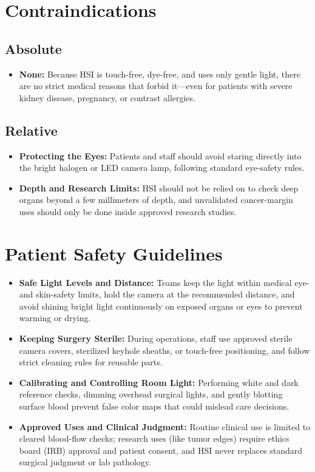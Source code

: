 \section{Contraindications}

\subsection{Absolute}
\begin{itemize}
    \item \textbf{None:} Because HSI is touch-free, dye-free, and uses only gentle light, there are no strict medical reasons that forbid it---even for patients with severe kidney disease, pregnancy, or contrast allergies.
\end{itemize}

\subsection{Relative}
\begin{itemize}
    \item \textbf{Protecting the Eyes:} Patients and staff should avoid staring directly into the bright halogen or LED camera lamp, following standard eye-safety rules.
    \item \textbf{Depth and Research Limits:} HSI should not be relied on to check deep organs beyond a few millimeters of depth, and unvalidated cancer-margin uses should only be done inside approved research studies.
\end{itemize}

\section{Patient Safety Guidelines}
\begin{itemize}
    \item \textbf{Safe Light Levels and Distance:} Teams keep the light within medical eye- and skin-safety limits, hold the camera at the recommended distance, and avoid shining bright light continuously on exposed organs or eyes to prevent warming or drying.
    \item \textbf{Keeping Surgery Sterile:} During operations, staff use approved sterile camera covers, sterilized keyhole sheaths, or touch-free positioning, and follow strict cleaning rules for reusable parts.
    \item \textbf{Calibrating and Controlling Room Light:} Performing white and dark reference checks, dimming overhead surgical lights, and gently blotting surface blood prevent false color maps that could mislead care decisions.
    \item \textbf{Approved Uses and Clinical Judgment:} Routine clinical use is limited to cleared blood-flow checks; research uses (like tumor edges) require ethics board (IRB) approval and patient consent, and HSI never replaces standard surgical judgment or lab pathology.
\end{itemize}

